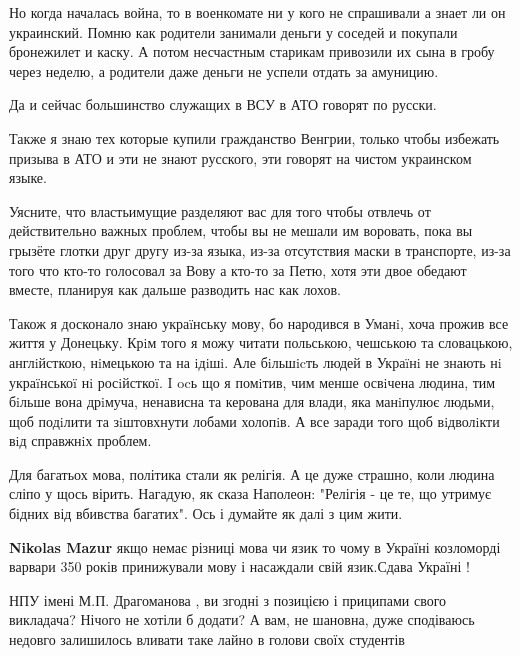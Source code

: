 \begin{itemize}
Но когда началась война, то в военкомате ни у кого не спрашивали а знает ли он
украинский. Помню как родители занимали деньги у соседей и покупали бронежилет
и каску. А потом несчастным старикам привозили их сына в гробу через неделю, а
родители даже деньги не успели отдать за амуницию.

Да и сейчас большинство служащих в ВСУ в АТО говорят по русски.

Также я знаю тех которые купили гражданство Венгрии, только чтобы избежать
призыва в АТО и эти не знают русского, эти говорят на чистом украинском языке.

Уясните, что властьимущие разделяют вас для того чтобы отвлечь от действительно
важных проблем, чтобы вы не мешали им воровать, пока вы грызёте глотки друг
другу из-за языка, из-за отсутствия маски в транспорте, из-за того что кто-то
голосовал за Вову а кто-то за Петю, хотя эти двое обедают вместе, планируя как
дальше разводить нас как лохов.

Також я досконало знаю украïнську мову, бо народився в Уманi, хоча прожив все
життя у Донецьку. Крiм того я можу читати польською, чешською та словацькою,
англiйсткою, нiмецькою та на iдiшi. Але бiльшicть людей в Украïнi не знають нi
украïнськоï нi росiйсткоï. I ocь що я помiтив, чим менше освiчена людина, тим
бiльше вона дрiмуча, ненависна та керована для влади, яка манiпулює людьми, щоб
подiлити та зiштовхнути лобами холопiв. А все заради того щоб вiдволiкти вiд
справжнiх проблем.

Для багатьох мова, політика стали як релігія. А це дуже страшно, коли людина
сліпо у щось вірить. Нагадую, як сказа Наполеон: "Релігія - це те, що утримує
бідних від вбивства багатих". Ось і думайте як далі з цим жити.

\begin{itemize}

\textbf{Nikolas Mazur} якщо немає різниці мова чи язик то чому в Україні козломорді варвари 350 років принижували мову і насаждали свій язик.Сдава Україні !
\end{itemize}


НПУ імені М.П. Драгоманова , ви згодні з позицією і приципами свого викладача? Нічого не хотіли б додати?
А вам, не шановна, дуже сподіваюсь недовго залишилось вливати таке лайно в голови своїх студентів


\end{itemize}
